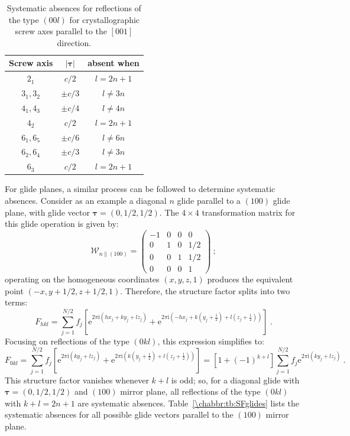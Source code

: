 \begin{table}[h!]
\centering\leavevmode
\begin{tabular}{|c|c|c|}
\hline
Screw axis & $\vert\bm{\tau}\vert$ & absent when \\
\hline\hline
$2_1$ & $c/2$ & $l=2n+1$ \\
$3_1,3_2$& $\pm c/3$ & $l\neq 3n$ \\
$4_1,4_3$& $\pm c/4$ & $l\neq 4n$ \\
$4_2$ & $c/2$ & $l=2n+1$ \\
$6_1,6_5$& $\pm c/6$ & $l\neq 6n$ \\
$6_2,6_4$& $\pm c/3$ & $l\neq 3n$ \\
$6_3$ & $c/2$ & $l=2n+1$ \\
\hline
\end{tabular}
\caption{\label{\chabbr:tb:SFscrews}Systematic absences for reflections of the type $(00l)$ for crystallographic screw axes parallel to the $[001]$ direction.}
\end{table}

For glide planes, a similar process can be followed to determine systematic absences.  Consider as an example a diagonal $n$ glide parallel to a $(100)$ glide plane, with glide vector $\bm{\tau}=(0,1/2,1/2)$.  The $4\times 4$ transformation matrix for this glide operation is given by:
\[
	\mathcal{W}_{n\parallel (100)} = \begin{pmatrix}-1&0&0&0\\ 0&1&0&1/2\\ 0&0&1&1/2\\0&0&0&1\end{pmatrix}\ ;
\]
operating on the homogeneous coordinates $(x,y,z,1)$ produces the equivalent point $(-x,y+1/2,z+1/2,1)$.  Therefore, the structure factor splits into two terms:
\begin{equation*}
	F_{hkl} = \sum_{j=1}^{N/2}f_j\left[\mathrm{e}^{2\pi\mathrm{i}(hx_j+ky_j+lz_j)} + \mathrm{e}^{2\pi\mathrm{i}(-hx_j+k(y_j+\frac{1}{2})+l(z_j+\frac{1}{2}))}\right]\ .
\end{equation*}
Focusing on reflections of the type $(0kl)$, this expression simplifies to:
\begin{equation*}
	F_{0kl} = \sum_{j=1}^{N/2}f_j\left[\mathrm{e}^{2\pi\mathrm{i}(ky_j+lz_j)} + \mathrm{e}^{2\pi\mathrm{i}(k(y_j+\frac{1}{2})+l(z_j+\frac{1}{2}))}\right]=
	\left[1+(-1)^{k+l}\right] \sum_{j=1}^{N/2}f_j \mathrm{e}^{2\pi\mathrm{i}(ky_j+lz_j)}\ .
\end{equation*}
This structure factor vanishes whenever $k+l$ is odd; so, for a diagonal glide with $\bm{\tau}=(0,1/2,1/2)$ and $(100)$ mirror plane, all reflections of the type $(0kl)$ with $k+l=2n+1$ are systematic absences.  Table~\ref{\chabbr:tb:SFglides} lists the systematic absences for all possible glide vectors parallel to the $(100)$ mirror plane.

